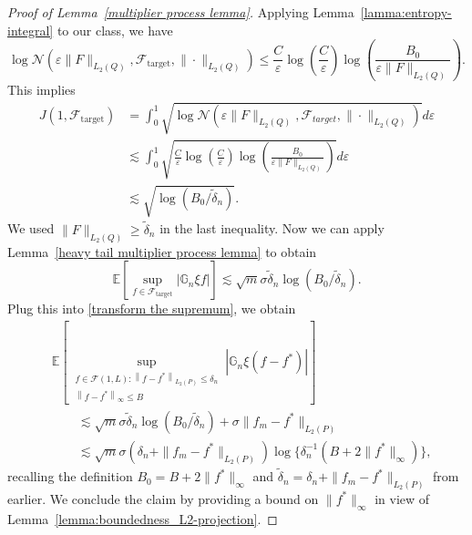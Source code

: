 \documentclass[12pt]{article}
\begin{document}
\begin{appendices}
\begin{proof}[Proof of Lemma~\ref{multiplier process lemma}]
Applying Lemma~\ref{lamma:entropy-integral} to our class, we have
\begin{equation}\nonumber
    \log \mathcal{N}\left(\varepsilon\|F\|_{L_2(Q)}, \mathcal{F}_{\textrm{target}}, \|\cdot\|_{L_2(Q)}\right) 
    \leq \frac{C}{\varepsilon} \log \left(\frac{C}{\varepsilon}\right) \log \left(\frac{B_0}{\varepsilon\|F\|_{L_2(Q)}}\right).
\end{equation}
This implies
\begin{equation}\nonumber
\begin{aligned}
    J(1,\mathcal{F}_{\textrm{target}}) &= \int_0^1 \sqrt{ \log \mathcal{N}\left(\varepsilon\|F\|_{L_2(Q)}, \mathcal{F}_{target}, \|\cdot\|_{L_2(Q)}\right) } d\varepsilon \\
    & \lesssim \int_0^1 \sqrt{\frac{C}{\varepsilon} \log \left(\frac{C}{\varepsilon}\right) \log \left(\frac{B_0}{\varepsilon\|F\|_{L_2(Q)}}\right)} d\varepsilon\\
    & \lesssim \sqrt{\log(B_0/\tilde \delta_n)}.
\end{aligned}
\end{equation}
We used $\|F\|_{L_2(Q)} \geq \tilde{\delta}_n$ in the last inequality. Now we can apply Lemma~\ref{heavy tail multiplier process lemma} to obtain
\begin{equation}\nonumber
\mathbb{E}\left[ 
\sup _{f\in \mathcal{F}_{\textrm{target}}}
\left|\mathbb{G}_n \xi f\right|\right]
\lesssim \sqrt{m} \sigma \tilde{\delta}_n \log (B_0 / \tilde{\delta}_n).
\end{equation}
Plug this into \eqref{transform the supremum}, we obtain 
\begin{equation}\nonumber
    \begin{aligned}
    &\mathbb{E}\left[ \sup _{\substack{f \in \mathcal{F}(1, L):\left\|f-f^*\right\|_{L_2(P)} \leq \delta_n \\\left\|f-f^*\right\|_{\infty} \leq B}}\left|\mathbb{G}_n\xi\left(f-f^*\right)\right|\right] \nonumber\\
    &\qquad \lesssim \sqrt{m} \sigma \tilde{\delta}_n \log (B_0 / \tilde{\delta}_n) + \sigma \|f_m - f^*\|_{L_2(P)}\\
    &  \qquad\lesssim \sqrt{m}\sigma (\delta_n + \|f_m - f^*\|_{L_2(P)}) \log\{\delta_n^{-1}(B+2\|f^*\|_\infty)\},
    \end{aligned}
\end{equation}
recalling the definition $B_0 = B + 2\|f^*\|_{\infty}$ and $\tilde\delta_n = \delta_n + \|f_m - f^*\|_{L_2(P)}$ from earlier. We conclude the claim by providing a bound on $\|f^*\|_\infty$ in view of Lemma~\ref{lemma:boundedness_L2-projection}. 
\end{proof}


\end{appendices}
\end{document}
